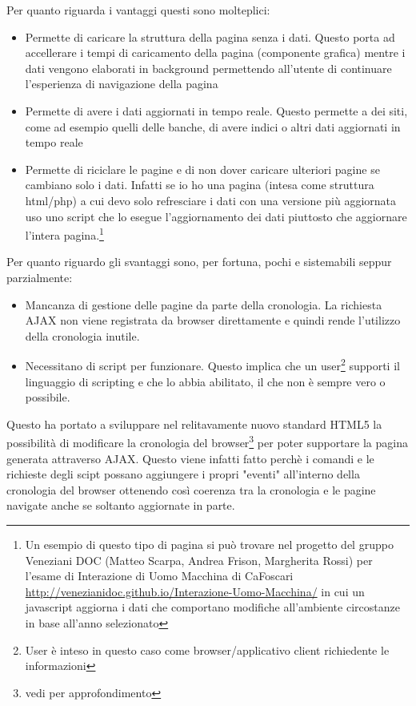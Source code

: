 \documentclass[a4paper,12pt]{report}
\begin{document}
Per quanto riguarda i vantaggi questi sono molteplici:
\begin{itemize}
\item Permette di caricare la struttura della pagina senza i dati. Questo porta ad accellerare i tempi di caricamento della pagina (componente grafica) mentre i dati vengono elaborati in background permettendo all'utente di continuare l'esperienza di navigazione della pagina
\item Permette di avere i dati aggiornati in tempo reale. Questo permette a dei siti, come ad esempio quelli delle banche, di avere indici o altri dati aggiornati in tempo reale
\item Permette di riciclare le pagine e di non dover caricare ulteriori pagine se cambiano solo i dati. Infatti se io ho una pagina (intesa come struttura html/php) a cui devo solo refresciare i dati con una versione più aggiornata uso uno script che lo esegue l'aggiornamento dei dati piuttosto che aggiornare l'intera pagina.\footnote{Un esempio di questo tipo di pagina si può trovare nel progetto del gruppo Veneziani DOC (Matteo Scarpa, Andrea Frison, Margherita Rossi) per l'esame di Interazione di Uomo Macchina di CaFoscari \url{http://venezianidoc.github.io/Interazione-Uomo-Macchina/} in cui un javascript aggiorna i dati che comportano modifiche all'ambiente circostanze in base all'anno selezionato}
\end{itemize}

Per quanto riguardo gli svantaggi sono, per fortuna, pochi e sistemabili seppur parzialmente:
\begin{itemize}
\item Mancanza di gestione delle pagine da parte della cronologia. La richiesta AJAX non viene registrata da browser direttamente e quindi rende l'utilizzo della cronologia inutile.
\item Necessitano di script per funzionare. Questo implica che un user\footnote{User è inteso in questo caso come browser/applicativo client richiedente le informazioni} supporti il linguaggio di scripting e che lo abbia abilitato, il che non è sempre vero o possibile.
\end{itemize}

Questo ha portato a sviluppare nel relitavamente nuovo standard HTML5 la possibilità di modificare la cronologia del browser\footnote{vedi \cites{site:w3chtml5} per approfondimento} per poter supportare la pagina generata attraverso AJAX. Questo viene infatti fatto perchè i comandi e le richieste degli scipt possano aggiungere i propri "eventi" all'interno della cronologia del browser ottenendo così coerenza tra la cronologia e le pagine navigate anche se soltanto aggiornate in parte.
\end{document}
